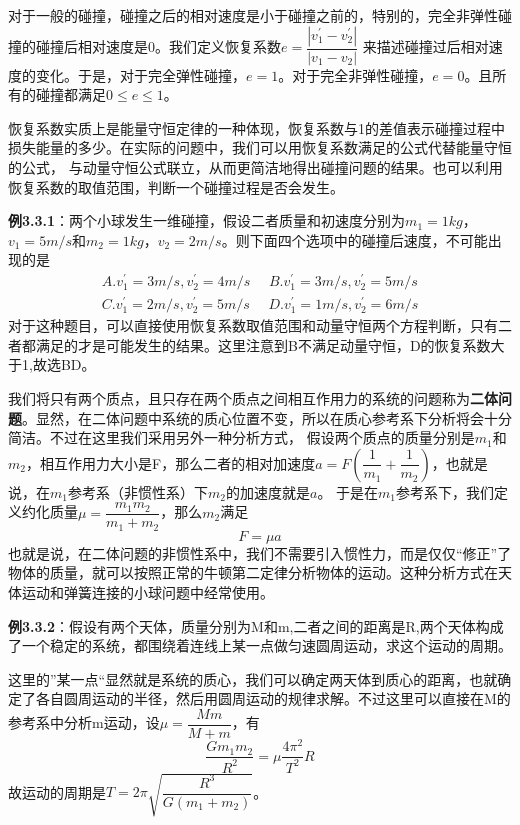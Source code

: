 \documentclass{article}
\begin{document}
    对于一般的碰撞，碰撞之后的相对速度是小于碰撞之前的，特别的，完全非弹性碰撞的碰撞后相对速度是0。我们定义恢复系数\(e = \dfrac{|v_1^\prime - v_2^\prime|}{|v_1 - v_2|}\)
    来描述碰撞过后相对速度的变化。于是，对于完全弹性碰撞，\(e=1\)。对于完全非弹性碰撞，\(e=0\)。且所有的碰撞都满足\(0\le e \le 1\)。

    恢复系数实质上是能量守恒定律的一种体现，恢复系数与1的差值表示碰撞过程中损失能量的多少。在实际的问题中，我们可以用恢复系数满足的公式代替能量守恒的公式，
    与动量守恒公式联立，从而更简洁地得出碰撞问题的结果。也可以利用恢复系数的取值范围，判断一个碰撞过程是否会发生。

    \textbf{例3.3.1}：两个小球发生一维碰撞，假设二者质量和初速度分别为\(m_1 = 1kg\)，\(v_1 = 5m/s\)和\(m_2 =1kg\)，\(v_2 = 2m/s\)。则下面四个选项中的碰撞后速度，不可能出现的是
    \begin{align*}
        A.v_1^\prime = 3m/s , v_2^\prime = 4m/s \ \ \ \ \ \ B.v_1^\prime =  3m/s , v_2^\prime = 5m/s \\
        C.v_1^\prime = 2m/s , v_2^\prime = 5m/s \ \ \ \ \ \ D.v_1^\prime =  1m/s , v_2^\prime = 6m/s
    \end{align*}
    对于这种题目，可以直接使用恢复系数取值范围和动量守恒两个方程判断，只有二者都满足的才是可能发生的结果。这里注意到B不满足动量守恒，D的恢复系数大于1,故选BD。

    我们将只有两个质点，且只存在两个质点之间相互作用力的系统的问题称为\textbf{二体问题}。显然，在二体问题中系统的质心位置不变，所以在质心参考系下分析将会十分简洁。不过在这里我们采用另外一种分析方式，
    假设两个质点的质量分别是\(m_1\)和\(m_2\)，相互作用力大小是F，那么二者的相对加速度\(a = F(\dfrac{1}{m_1} + \dfrac{1}{m_2})\)，也就是说，在\(m_1\)参考系（非惯性系）下\(m_2\)的加速度就是\(a\)。
    于是在\(m_1\)参考系下，我们定义约化质量\(\mu = \dfrac{m_1 m_2}{m_1 + m_2}\)，那么\(m_2\)满足
    \begin{equation*}
        F = \mu a
    \end{equation*}
    也就是说，在二体问题的非惯性系中，我们不需要引入惯性力，而是仅仅“修正”了物体的质量，就可以按照正常的牛顿第二定律分析物体的运动。这种分析方式在天体运动和弹簧连接的小球问题中经常使用。

    \textbf{例3.3.2}：假设有两个天体，质量分别为M和m,二者之间的距离是R,两个天体构成了一个稳定的系统，都围绕着连线上某一点做匀速圆周运动，求这个运动的周期。

    这里的”某一点“显然就是系统的质心，我们可以确定两天体到质心的距离，也就确定了各自圆周运动的半径，然后用圆周运动的规律求解。不过这里可以直接在M的参考系中分析m运动，设\(\mu = \dfrac{Mm}{M+m}\)，有
    \begin{equation*}
        \frac{G m_1 m_2}{R^2} = \mu \frac{4\pi^2}{T^2} R
    \end{equation*}
    故运动的周期是\(T = 2\pi \sqrt{\dfrac{R^3}{G(m_1 + m_2)}}\)。
\end{document}
